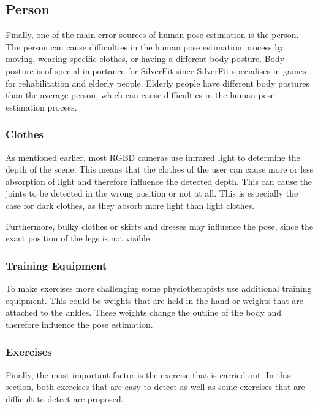 \subsection{Person}

Finally, one of the main error sources of human pose estimation is the person. The person can cause difficulties in the human pose estimation process by moving, wearing specific clothes, or having a different body posture. Body posture is of special importance for SilverFit since SilverFit specialises in games for rehabilitation and elderly people. Elderly people have different body postures than the average person, which can cause difficulties in the human pose estimation process.

\subsubsection{Clothes}

As mentioned earlier, most RGBD cameras use infrared light to determine the depth of the scene. This means that the clothes of the user can cause more or less absorption of light and therefore influence the detected depth. This can cause the joints to be detected in the wrong position or not at all. This is especially the case for dark clothes, as they absorb more light than light clothes.

Furthermore, bulky clothes or skirts and dresses may influence the pose, since the exact position of the legs is not visible.

\subsubsection{Training Equipment}

To make exercises more challenging some physiotherapists use additional training equipment. This could be weights that are held in the hand or weights that are attached to the ankles. These weights change the outline of the body and therefore influence the pose estimation. 

\subsubsection{Exercises}
\label{sec:exercises}

Finally, the most important factor is the exercise that is carried out. In this section, both exercises that are easy to detect as well as some exercises that are difficult to detect are proposed.

